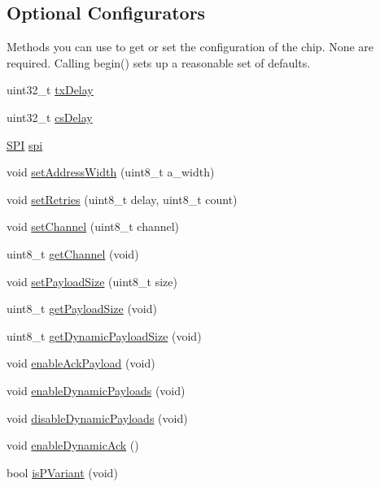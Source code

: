 \subsection*{Optional Configurators}
\label{_amgrpe1a83b99ec8153e5baf680edeeed1586}%
 Methods you can use to get or set the configuration of the chip. None are required. Calling begin() sets up a reasonable set of defaults. \begin{DoxyCompactItemize}
\item 
uint32\+\_\+t \hyperlink{classNRF24L01_a1feaab910ecff17805f8141fe40028e7}{tx\+Delay}
\item 
uint32\+\_\+t \hyperlink{classNRF24L01_abae8b8afbf747344006d6163c607be00}{cs\+Delay}
\item 
\hyperlink{classSPI}{S\+PI} \hyperlink{classNRF24L01_a6321af25fee367445baa6ab4840f8443}{spi}
\item 
void \hyperlink{classNRF24L01_a17752733515f67aa9f6ed3daa1ed3d1d}{set\+Address\+Width} (uint8\+\_\+t a\+\_\+width)
\item 
void \hyperlink{classNRF24L01_a0bb209d94b62e2a28af53179af713f3c}{set\+Retries} (uint8\+\_\+t delay, uint8\+\_\+t count)
\item 
void \hyperlink{classNRF24L01_aa8eaf9d5ed604f60a00cd79fed9edad7}{set\+Channel} (uint8\+\_\+t channel)
\item 
uint8\+\_\+t \hyperlink{classNRF24L01_a6b269b519d57d54d0682a29ce9036b12}{get\+Channel} (void)
\item 
void \hyperlink{classNRF24L01_abe5983a57d0d3bd77508e5345774c890}{set\+Payload\+Size} (uint8\+\_\+t size)
\item 
uint8\+\_\+t \hyperlink{classNRF24L01_a4a7f48ca92e14baabd8be1c0831e8c2f}{get\+Payload\+Size} (void)
\item 
uint8\+\_\+t \hyperlink{classNRF24L01_a0d0cd5dd09d60e06280f378166725d64}{get\+Dynamic\+Payload\+Size} (void)
\item 
void \hyperlink{classNRF24L01_ae4067455572c6731211315b3900f5cbd}{enable\+Ack\+Payload} (void)
\item 
void \hyperlink{classNRF24L01_abd060c4df7efac781ed5812a0ee19d08}{enable\+Dynamic\+Payloads} (void)
\item 
void \hyperlink{classNRF24L01_abf6bf0c18b2b12674cfbc150a2bdb778}{disable\+Dynamic\+Payloads} (void)
\item 
void \hyperlink{classNRF24L01_aeaa968ea74bfd2690fff331e9f115344}{enable\+Dynamic\+Ack} ()
\item 
bool \hyperlink{classNRF24L01_ad05024c9586c1dc76c2fd95d54ce6b4c}{is\+P\+Variant} (void)

\end{DoxyCompactItemize}
